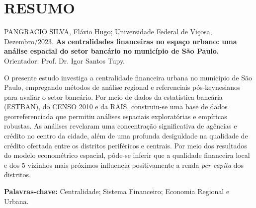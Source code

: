 \documentclass[a4paper,12pt]{article}
\renewcommand*\contentsname{Índice}
\newcommand\contentsname{Índice}
\renewcommand*\listfigurename{Lista de Figuras}
\newcommand\listfigurename{Lista de Figuras}
\renewcommand*\listtablename{Lista de Tabelas}
\newcommand\listtablename{Lista de Tabelas}
\begin{document}
\newpage
\pagestyle{fancy}

\section*{RESUMO}


\begin{spacing}{1.0}
\justify

\setlength{\parindent}{0pt}

PANGRACIO SILVA, Flávio Hugo; Universidade Federal de Viçosa, Dezembro/2023. \textbf{As centralidades financeiras no espaço urbano: uma análise espacial do setor bancário no município de São Paulo.} Orientador: Prof. Dr. Igor Santos Tupy.

O presente estudo investiga a centralidade financeira urbana no municipio de São Paulo, empregando métodos de análise regional e referenciais pós-keynesianos para avaliar o setor bancário. Por meio de dados da estatística bancária (ESTBAN), do CENSO 2010 e da RAIS, construiu-se uma base de dados georreferenciada que permitiu análises espaciais exploratórias e empíricas robustas. As análises revelaram uma concentração significativa de agências e crédito no centro da cidade, além de uma profunda desiguldade na qualidade de crédito ofertada entre os distritos periféricos e centrais. Por meio dos resultados do modelo econométrico espacial, pôde-se inferir que a qualidade financeira local e dos 5 vizinhos mais próximos influencia positivamente a renda \textit{per capita} dos distritos.

\textbf{Palavras-chave:} Centralidade; Sistema Financeiro; Economia
Regional e Urbana.

\setlength{\parindent}{15pt}

\end{spacing}

\newpage
\renewcommand{\listfigurename}{LISTA DE FIGURAS}
\pagestyle{fancy}
\listoffigures

\newpage
\renewcommand{\listtablename}{LISTA DE TABELAS}
\pagestyle{fancy}
\listoftables

\newpage
\renewcommand{\contentsname}{SUMÁRIO}
\pagestyle{fancy}
\tableofcontents

\newpage
{}\pagestyle{fancy} \justify \onehalfspacing
\end{document}
